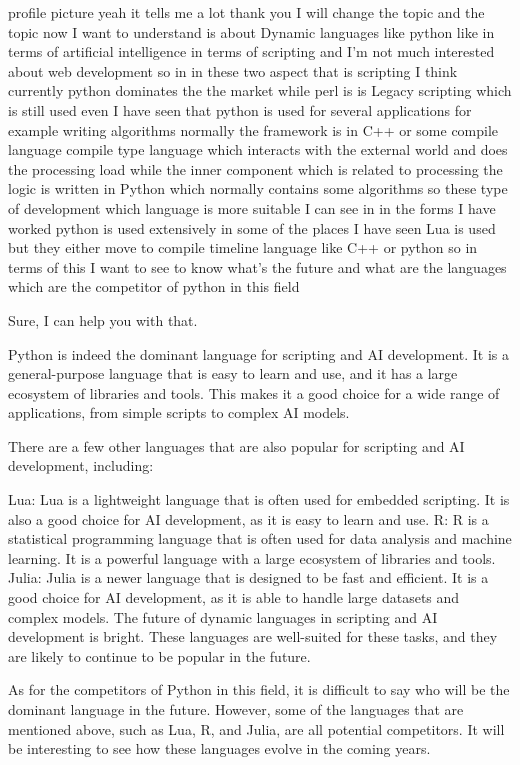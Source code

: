 \documentclass[11pt]{article}
\begin{document}
profile picture
yeah it tells me a lot thank you
I will change the topic and the topic now I want to understand is about Dynamic languages
like python
like in terms of artificial intelligence in terms of scripting and
I'm not much interested about web development so in in these two aspect that is scripting
I think
currently python  dominates the
the market
while perl is
is Legacy scripting
which is still used
even I have seen that
python
is used for
several applications
for example writing
algorithms
normally the framework is in C++ or
some compile language
compile type language
which interacts with
the external world
and
does the processing
load
while the inner component which is related to
processing the logic
is
written in Python
which normally contains some algorithms
so these type of development
which language is more suitable I can see in in the forms I have worked
python is used
extensively
in some of the places I have seen Lua
is used
but
they
either move to compile timeline language like C++
or python
so in terms of this I want to see to know
what's the future
and what are the languages which are the competitor of python
in this field

Sure, I can help you with that.

Python is indeed the dominant language for scripting and AI development. It is a general-purpose language that is easy to learn and use, and it has a large ecosystem of libraries and tools. This makes it a good choice for a wide range of applications, from simple scripts to complex AI models.

There are a few other languages that are also popular for scripting and AI development, including:

Lua: Lua is a lightweight language that is often used for embedded scripting. It is also a good choice for AI development, as it is easy to learn and use.
R: R is a statistical programming language that is often used for data analysis and machine learning. It is a powerful language with a large ecosystem of libraries and tools.
Julia: Julia is a newer language that is designed to be fast and efficient. It is a good choice for AI development, as it is able to handle large datasets and complex models.
The future of dynamic languages in scripting and AI development is bright. These languages are well-suited for these tasks, and they are likely to continue to be popular in the future.

As for the competitors of Python in this field, it is difficult to say who will be the dominant language in the future. However, some of the languages that are mentioned above, such as Lua, R, and Julia, are all potential competitors. It will be interesting to see how these languages evolve in the coming years.
\end{document}
